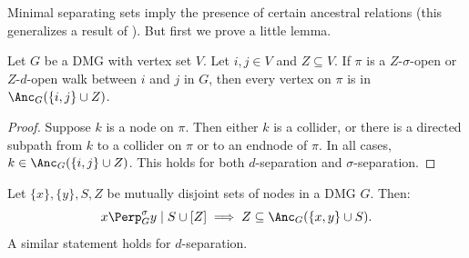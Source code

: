 Minimal separating sets imply the presence of certain ancestral relations (this generalizes a result of \cite{SMR1999}).
But first we prove a little lemma.
\begin{Lem}\label{lem:ancestral_relations_open_path}
  Let $G$ be a DMG with vertex set $V$. Let $i, j \in V$ and $Z \subseteq V$.
  If $\pi$ is a $Z$-$\sigma$-open or $Z$-$d$-open walk between $i$ and $j$ in $G$, then every vertex on $\pi$ is in $\Anc_G(\{i,j\} \cup Z)$.
\end{Lem}
\begin{proof}
  Suppose $k$ is a node on $\pi$. 
  Then either $k$ is a collider, or there is a directed subpath from $k$ to a collider on $\pi$ or to an endnode of $\pi$. 
  In all cases, $k \in \Anc_G(\{i,j\}\cup Z)$.
  This holds for both $d$-separation and $\sigma$-separation.
\end{proof}
\begin{Prp}\label{prp:min_sep}
Let $\{x\},\{y\},S,Z$ be mutually disjoint sets of nodes in a DMG $G$.
Then:
$$x \Perp^\sigma_G y \mid S \cup [Z] \implies Z \subseteq \Anc_{G}(\{x, y\} \cup S).$$
A similar statement holds for $d$-separation.
\end{Prp}
